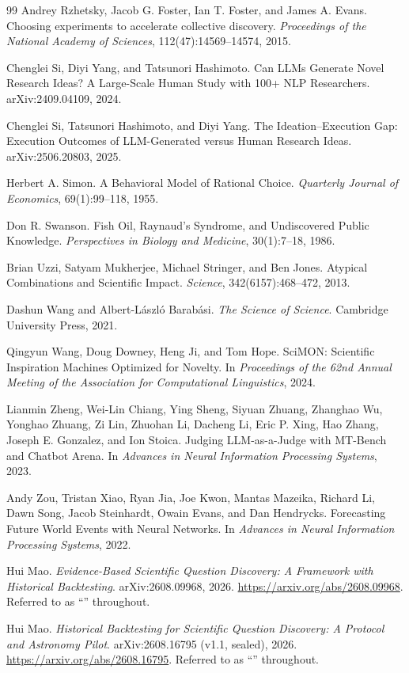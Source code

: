 \documentclass[11pt]{article}
\begin{document}
\begin{thebibliography}{99}
Andrey Rzhetsky, Jacob G. Foster, Ian T. Foster, and James A. Evans.
Choosing experiments to accelerate collective discovery. \emph{Proceedings
of the National Academy of Sciences}, 112(47):14569--14574, 2015.

Chenglei Si, Diyi Yang, and Tatsunori Hashimoto. Can LLMs Generate Novel
Research Ideas? A Large-Scale Human Study with 100+ NLP Researchers.
arXiv:2409.04109, 2024.

Chenglei Si, Tatsunori Hashimoto, and Diyi Yang. The Ideation--Execution
Gap: Execution Outcomes of LLM-Generated versus Human Research Ideas.
arXiv:2506.20803, 2025.

Herbert A. Simon. A Behavioral Model of Rational Choice. \emph{Quarterly
Journal of Economics}, 69(1):99--118, 1955.

Don R. Swanson. Fish Oil, Raynaud's Syndrome, and Undiscovered Public
Knowledge. \emph{Perspectives in Biology and Medicine}, 30(1):7--18, 1986.

Brian Uzzi, Satyam Mukherjee, Michael Stringer, and Ben Jones. Atypical
Combinations and Scientific Impact. \emph{Science}, 342(6157):468--472,
2013.

Dashun Wang and Albert-L\'aszl\'o Barab\'asi. \emph{The Science of Science}.
Cambridge University Press, 2021.

Qingyun Wang, Doug Downey, Heng Ji, and Tom Hope. SciMON: Scientific
Inspiration Machines Optimized for Novelty. In \emph{Proceedings of the 62nd
Annual Meeting of the Association for Computational Linguistics}, 2024.

Lianmin Zheng, Wei-Lin Chiang, Ying Sheng, Siyuan Zhuang, Zhanghao Wu,
Yonghao Zhuang, Zi Lin, Zhuohan Li, Dacheng Li, Eric P. Xing, Hao Zhang,
Joseph E. Gonzalez, and Ion Stoica. Judging LLM-as-a-Judge with MT-Bench and
Chatbot Arena. In \emph{Advances in Neural Information Processing Systems},
2023.

Andy Zou, Tristan Xiao, Ryan Jia, Joe Kwon, Mantas Mazeika, Richard Li, Dawn
Song, Jacob Steinhardt, Owain Evans, and Dan Hendrycks. Forecasting Future
World Events with Neural Networks. In \emph{Advances in Neural Information
Processing Systems}, 2022.

Hui Mao.
\emph{Evidence-Based Scientific Question Discovery: A Framework with
Historical Backtesting}.
arXiv:2608.09968, 2026.
\url{https://arxiv.org/abs/2608.09968}.
Referred to as ``\cite{paper1}'' throughout.

Hui Mao.
\emph{Historical Backtesting for Scientific Question Discovery: A
Protocol and Astronomy Pilot}.
arXiv:2608.16795 (v1.1, sealed), 2026.
\url{https://arxiv.org/abs/2608.16795}.
Referred to as ``\cite{paper2}'' throughout.

\end{thebibliography}
\end{document}
